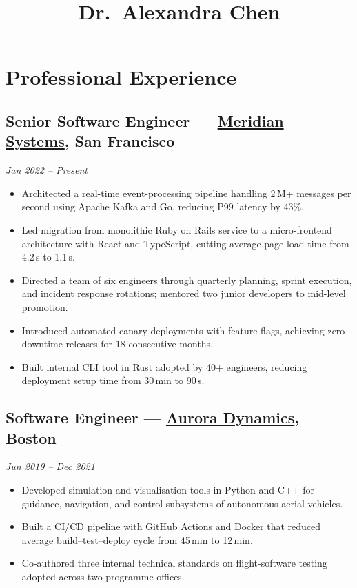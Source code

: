 \documentclass[
    language=english,
    doctype=cv,
    institution=none,
    titlestyle=simple
]{../../omnilatex}
\title{Dr.\ Alexandra Chen}
\begin{document}
\maketitle

\section{\texorpdfstring{\color{cvsection}}{} \hspace{4pt}Professional Experience}

\subsection{Senior Software Engineer --- \href{https://meridiansys.com}{Meridian Systems}, San Francisco}
\textit{Jan 2022 -- Present}
\begin{itemize}
    \item Architected a real-time event-processing pipeline handling 2\,M+ messages per second using Apache Kafka and Go, reducing P99 latency by 43\%.
    \item Led migration from monolithic Ruby on Rails service to a micro-frontend architecture with React and TypeScript, cutting average page load time from 4.2\,s to 1.1\,s.
    \item Directed a team of six engineers through quarterly planning, sprint execution, and incident response rotations; mentored two junior developers to mid-level promotion.
    \item Introduced automated canary deployments with feature flags, achieving zero-downtime releases for 18 consecutive months.
    \item Built internal CLI tool in Rust adopted by 40+ engineers, reducing deployment setup time from 30\,min to 90\,s.
\end{itemize}

\subsection{Software Engineer --- \href{https://auroradyne.com}{Aurora Dynamics}, Boston}
\textit{Jun 2019 -- Dec 2021}
\begin{itemize}
    \item Developed simulation and visualisation tools in Python and C++ for guidance, navigation, and control subsystems of autonomous aerial vehicles.
    \item Built a CI/CD pipeline with GitHub Actions and Docker that reduced average build--test--deploy cycle from 45\,min to 12\,min.
    \item Co-authored three internal technical standards on flight-software testing adopted across two programme offices.
\end{itemize}
\end{document}
